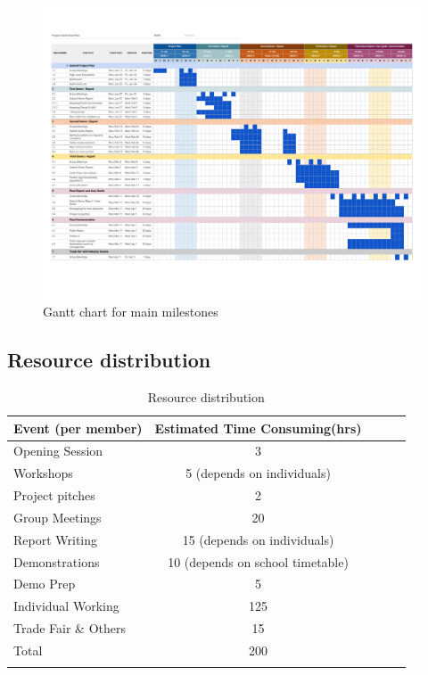 \documentclass{article}
\begin{document}
\begin{figure}
\vskip 3mm
\begin{center}
\begin{small}
\begin{sc}
\centerline{\includegraphics[width=\paperwidth]{figs/Gantt.pdf}}
\caption{Gantt chart for main milestones}
\label{Gantt Chart}
\end{sc}
\end{small}
\end{center}
\vskip -3mm
\end{figure} 


\subsection{Resource distribution}
\begin{table}[h]
\vskip 3mm
\begin{center}
\begin{small}
\begin{sc}
\begin{tabular}{lcccr}
\hline
\abovespace\belowspace
Event (per member) & Estimated Time Consuming(hrs) \\ \hline
\hline
\abovespace
Opening Session & 3 \\ \hline
Workshops & 5 (depends on individuals) \\ \hline
Project pitches & 2 \\ \hline
Group Meetings & 20  \\ \hline
Report Writing & 15 (depends on individuals) \\ \hline
Demonstrations & 10 (depends on school timetable) \\ \hline
Demo Prep & 5 \\ \hline
Individual Working  & 125 \\ \hline
Trade Fair \& Others & 15 \\ \hline
Total & 200 \\ \hline
\belowspace
\end{tabular}
\end{sc}
\end{small}
\caption{Resource distribution}
\label{tab:sample-table}
\end{center}
\vskip -3mm
\end{table}
\end{document}
